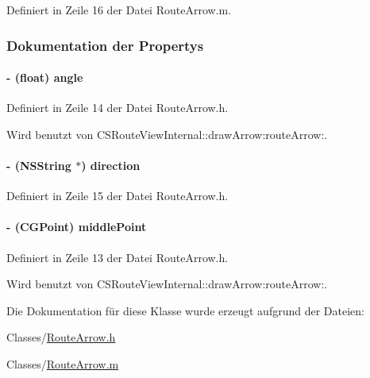 Definiert in Zeile 16 der Datei RouteArrow.m.

\subsubsection{Dokumentation der Propertys}
\hypertarget{interface_route_arrow_a0cb54129ee3e72c2bac68f7086c38594}{
\paragraph[{angle}]{\setlength{\rightskip}{0pt plus 5cm}-\/ (float) angle}\hfill}
\label{interface_route_arrow_a0cb54129ee3e72c2bac68f7086c38594}


Definiert in Zeile 14 der Datei RouteArrow.h.

Wird benutzt von CSRouteViewInternal::drawArrow:routeArrow:.\hypertarget{interface_route_arrow_a6d5a8acfc1336e1f72fd2632d1155494}{
\paragraph[{direction}]{\setlength{\rightskip}{0pt plus 5cm}-\/ (NSString $\ast$) direction}\hfill}
\label{interface_route_arrow_a6d5a8acfc1336e1f72fd2632d1155494}


Definiert in Zeile 15 der Datei RouteArrow.h.\hypertarget{interface_route_arrow_a0f958b0fee2afdfcbb7bae201a914c7c}{
\paragraph[{middlePoint}]{\setlength{\rightskip}{0pt plus 5cm}-\/ (CGPoint) middlePoint}\hfill}
\label{interface_route_arrow_a0f958b0fee2afdfcbb7bae201a914c7c}


Definiert in Zeile 13 der Datei RouteArrow.h.

Wird benutzt von CSRouteViewInternal::drawArrow:routeArrow:.

Die Dokumentation für diese Klasse wurde erzeugt aufgrund der Dateien:\begin{DoxyCompactItemize}
\item 
Classes/\hyperlink{_route_arrow_8h}{RouteArrow.h}\item 
Classes/\hyperlink{_route_arrow_8m}{RouteArrow.m}\end{DoxyCompactItemize}

